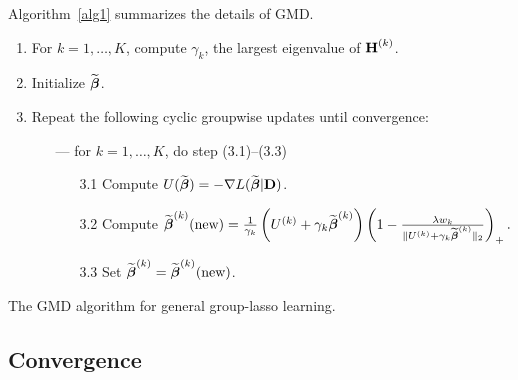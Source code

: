 Algorithm~\ref{alg1} summarizes the details of GMD.

\begin{algorithm}
	\begin{enumerate}
		\item For $k=1,\ldots,K$, compute $\gamma_k$, the largest eigenvalue of $\textbf{H}^{(k)}$.
		\item Initialize $\widetilde {\boldsymbol{\beta}}$.
		\item Repeat the following cyclic groupwise updates until convergence:
		\begin{enumerate}
			\item[---] for $k=1,\ldots,K$, do step (3.1)--(3.3)
			\begin{enumerate}
				\item[3.1]
				Compute $U(\widetilde {\boldsymbol{\beta}} )=-\nabla L(\widetilde {\boldsymbol{\beta}} | \textbf{D})$.
				\item[3.2]
				Compute
				$
				\widetilde {\boldsymbol{\beta}}^{(k)}(\textrm{new}) = \frac{1}{\gamma_k}\left( U^{(k)}+\gamma_k \widetilde {\boldsymbol{\beta}}^{(k)} \right)\left(1-\frac{\lambda w_k}{\Vert U^{(k)}+\gamma_k \widetilde {\boldsymbol{\beta}}^{(k)} \Vert_2}\right)_{+} .
				$
				\item[3.3]
				Set $\widetilde {\boldsymbol{\beta}}^{(k)}=\widetilde {\boldsymbol{\beta}}^{(k)}(\textrm{new})$.
			\end{enumerate}
		\end{enumerate}
	\end{enumerate}
	\caption{The GMD algorithm for general group-lasso learning. \label{alg1}}
\end{algorithm}


\subsection{Convergence}

